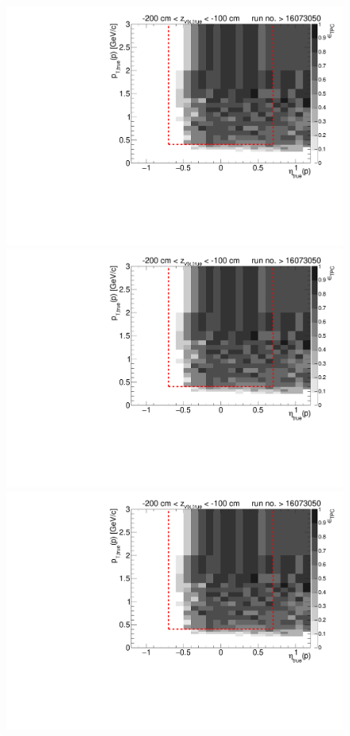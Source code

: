 \begin{figure}[hb]
{		\includegraphics[width=\linewidth,page=6]{graphics/eff/Eff2D_TPC_proton_Minus_RunRange2.pdf}\\
		\includegraphics[width=\linewidth,page=8]{graphics/eff/Eff2D_TPC_proton_Minus_RunRange2.pdf}\\
		\includegraphics[width=\linewidth,page=10]{graphics/eff/Eff2D_TPC_proton_Minus_RunRange2.pdf}
	}%
\end{figure}
